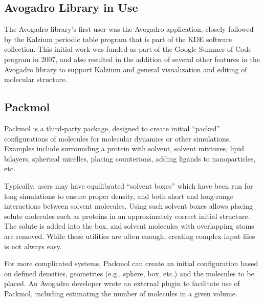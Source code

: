 \documentclass[10pt]{bmc_article}
\newenvironment{bmcformat}{\begin{raggedright}
\baselineskip20pt\sloppy\setboolean{publ}{false}}{\end{raggedright}
\baselineskip20pt\sloppy}
\begin{document}
\begin{bmcformat}
\section{Avogadro Library in Use}

The Avogadro library's first user was the Avogadro application, closely
followed by the Kalzium periodic table program that is part of the KDE software
collection. This initial work was funded as part of the Google Summer of Code
program in 2007, and also resulted in the addition of several other features in
the Avogadro library to support Kalzium and general visualization and editing
of molecular structure.

\subsection{Packmol}

Packmol is a third-party package, designed to create initial
``packed'' configurations of molecules for molecular dynamics or other
simulations.~\cite{packmol}\cite{packmol-packing} Examples include
surrounding a protein with solvent, solvent mixtures, lipid bilayers,
spherical micelles, placing counterions, adding ligands to
nanoparticles, etc.

Typically, users may have equilibrated ``solvent boxes'' which have
been run for long simulations to ensure proper density, and both short
and long-range interactions between solvent molecules. Using such
solvent boxes allows placing solute molecules such as proteins in an
approximately correct initial structure. The solute is added into the
box, and solvent molecules with overlapping atoms are removed. While
these utilities are often enough, creating complex input files is not
always easy.

For more complicated systems, Packmol can create an initial
configuration based on defined densities, geometries (e.g., sphere,
box, etc.) and the molecules to be placed. An Avogadro developer wrote
an external plugin to facilitate use of Packmol, including estimating
the number of molecules in a given volume.


\end{bmcformat}
\end{document}
